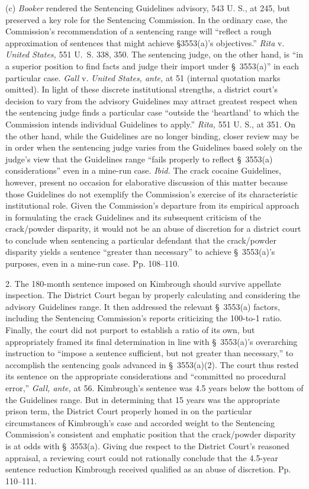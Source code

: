   (c) \emph{Booker} rendered the Sentencing Guidelines advisory, 543 U.
S., at 245, but preserved a key role for the Sentencing Commission. In
the ordinary case, the Commission's recommendation of a sentencing
range will ``reflect a rough approximation of sentences that might
achieve \S3553(a)'s objectives.'' \emph{Rita} v. \emph{United States,}
551 U.~S. 338, 350. The sentencing judge, on the other hand, is
``in a superior position to find facts and judge their import under
\S~3553(a)'' in each particular case. \emph{Gall} v. \emph{United States,
ante,} at 51 (internal quotation marks omitted). In light of these
discrete institutional strengths, a district court's decision to vary
from the advisory Guidelines may attract greatest respect when the
sentencing judge finds a particular case ``outside the ‘heartland'
to which the Commission intends individual Guidelines to apply.''
\emph{Rita,} 551 U. S., at 351. On the other hand, while the Guidelines
are no longer binding, closer review may be in order when the sentencing
judge varies from the Guidelines based solely on the judge's view
that the Guidelines range ``fails properly to reflect \S~3553(a)
considerations'' even in a mine-run case. \emph{Ibid.} The crack
cocaine Guidelines, however, present no occasion for elaborative
discussion of this matter because those Guidelines do not exemplify the
Commission's exercise of its characteristic institutional role. Given
the Commission's departure from its empirical approach in formulating
the crack Guidelines and its subsequent criticism of the crack/powder
disparity, it would not be an abuse of discretion for a district court
to conclude when sentencing a particular defendant that the crack/powder
disparity yields a sentence ``greater than necessary'' to achieve
\S~3553(a)'s purposes, even in a mine-run case. Pp. 108--110.

  2. The 180-month sentence imposed on Kimbrough should survive
appellate inspection. The District Court began by properly calculating
and considering the advisory Guidelines range. It then addressed the
relevant \S~3553(a) factors, including the Sentencing Commission's
reports criticizing the 100-to-1 ratio. Finally, the court did not
purport to establish a ratio of its own, but appropriately framed its
final determination in line with \S~3553(a)'s overarching instruction
to ``impose a sentence sufficient, but not greater than necessary,''
to accomplish the sentencing goals advanced in \S~3553(a)(2). The
court thus rested its sentence on the appropriate considerations
and ``committed no procedural error,'' \emph{Gall, ante,} at 56.
Kimbrough's sentence was 4.5 years below the bottom of the Guidelines
range. But in determining that 15 years was the appropriate prison term,
the District Court properly homed in on the particular circumstances of
Kimbrough's case and accorded weight to the Sentencing Commission's
consistent and emphatic \newpage  position that the crack/powder disparity
is at odds with \S~3553(a). Giving due respect to the District
Court's reasoned appraisal, a reviewing court could not rationally
conclude that the 4.5-year sentence reduction Kimbrough received
qualified as an abuse of discretion. Pp. 110--111.

